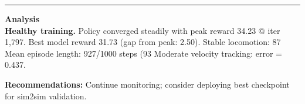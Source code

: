 \documentclass[a4paper,10pt]{article}
\begin{document}
\vspace{2pt}
\hrule
\vspace{2pt}

\footnotesize
\textbf{Analysis} \\[1pt]
\textbf{Healthy training.} Policy converged steadily with peak reward 34.23 @ iter 1,797.
Best model reward 31.73 (gap from peak: 2.50).
Stable locomotion: 87%
Mean episode length: 927/1000 steps (93%
Moderate velocity tracking: error = 0.437.

\textbf{Recommendations:}
Continue monitoring; consider deploying best checkpoint for sim2sim validation.
\end{document}

